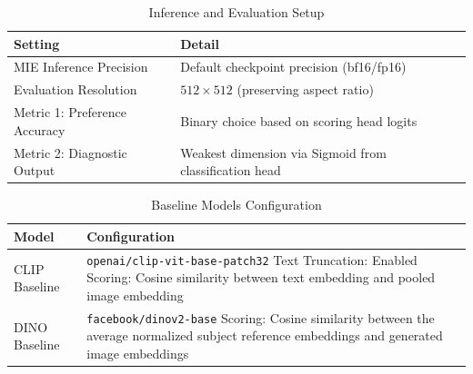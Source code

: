 \documentclass{article}
\begin{document}
\begin{table}[H]
\centering
\caption{Inference and Evaluation Setup}
\label{tab:eval_config}
\renewcommand{\arraystretch}{1.1}
\begin{tabular}{l p{8.5cm}}
\toprule
\textbf{Setting} & \textbf{Detail} \\
\midrule
MIE Inference Precision & Default checkpoint precision (bf16/fp16) \\
Evaluation Resolution & $512 \times 512$ (preserving aspect ratio) \\
Metric 1: Preference Accuracy & Binary choice based on scoring head logits \\
Metric 2: Diagnostic Output & Weakest dimension via Sigmoid from classification head \\
\bottomrule
\end{tabular}
\end{table}

\begin{table}[H]
\centering
\caption{Baseline Models Configuration}
\label{tab:baselines_config}
\renewcommand{\arraystretch}{1.2}
\begin{tabular}{l p{8.5cm}}
\toprule
\textbf{Model} & \textbf{Configuration} \\
\midrule
CLIP Baseline & \texttt{openai/clip-vit-base-patch32} \newline Text Truncation: Enabled \newline Scoring: Cosine similarity between text embedding and pooled image embedding \\
\addlinespace
DINO Baseline & \texttt{facebook/dinov2-base} \newline Scoring: Cosine similarity between the average normalized subject reference embeddings and generated image embeddings \\
\bottomrule
\end{tabular}
\end{table}

\newpage

\end{document}
